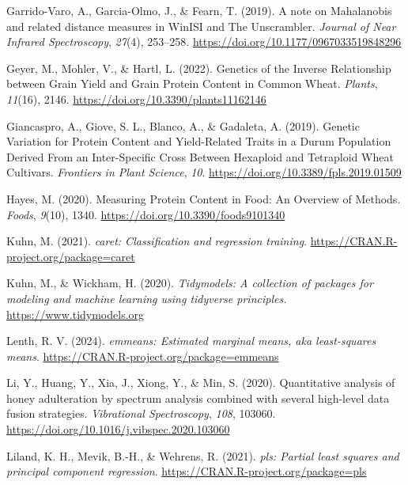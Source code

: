 \documentclass[
]{agujournal2019}
\newlength{\cslhangindent}
\newenvironment{CSLReferences}[2] %
 {\begin{list}{}{%
  \setlength{\itemindent}{0pt}
  \setlength{\leftmargin}{0pt}
  \setlength{\parsep}{0pt}
  \ifodd #1
   \setlength{\leftmargin}{\cslhangindent}
   \setlength{\itemindent}{-1\cslhangindent}
  \fi
  \setlength{\itemsep}{#2\baselineskip}}}
 {\end{list}}
\begin{document}
\begin{CSLReferences}{1}{0}
Garrido-Varo, A., Garcia-Olmo, J., \& Fearn, T. (2019). A note on
{Mahalanobis} and related distance measures in {WinISI} and {The}
{Unscrambler}. \emph{Journal of Near Infrared Spectroscopy},
\emph{27}(4), 253--258. \url{https://doi.org/10.1177/0967033519848296}

Geyer, M., Mohler, V., \& Hartl, L. (2022). Genetics of the {Inverse}
{Relationship} between {Grain} {Yield} and {Grain} {Protein} {Content}
in {Common} {Wheat}. \emph{Plants}, \emph{11}(16), 2146.
\url{https://doi.org/10.3390/plants11162146}

Giancaspro, A., Giove, S. L., Blanco, A., \& Gadaleta, A. (2019).
Genetic {Variation} for {Protein} {Content} and {Yield}-{Related}
{Traits} in a {Durum} {Population} {Derived} {From} an
{Inter}-{Specific} {Cross} {Between} {Hexaploid} and {Tetraploid}
{Wheat} {Cultivars}. \emph{Frontiers in Plant Science}, \emph{10}.
\url{https://doi.org/10.3389/fpls.2019.01509}

Hayes, M. (2020). Measuring {Protein} {Content} in {Food}: {An}
{Overview} of {Methods}. \emph{Foods}, \emph{9}(10), 1340.
\url{https://doi.org/10.3390/foods9101340}

Kuhn, M. (2021). \emph{{caret}: Classification and regression training}.
\url{https://CRAN.R-project.org/package=caret}

Kuhn, M., \& Wickham, H. (2020). \emph{{Tidymodels}: A collection of
packages for modeling and machine learning using tidyverse principles.}
\url{https://www.tidymodels.org}

Lenth, R. V. (2024). \emph{{emmeans}: Estimated marginal means, aka
least-squares means}. \url{https://CRAN.R-project.org/package=emmeans}

Li, Y., Huang, Y., Xia, J., Xiong, Y., \& Min, S. (2020). Quantitative
analysis of honey adulteration by spectrum analysis combined with
several high-level data fusion strategies. \emph{Vibrational
Spectroscopy}, \emph{108}, 103060.
\url{https://doi.org/10.1016/j.vibspec.2020.103060}

Liland, K. H., Mevik, B.-H., \& Wehrens, R. (2021). \emph{{pls}: Partial
least squares and principal component regression}.
\url{https://CRAN.R-project.org/package=pls}


\end{CSLReferences}
\end{document}
